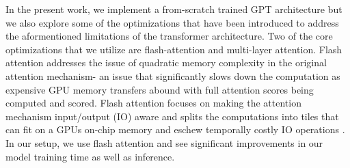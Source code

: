 In the present work, we implement a from-scratch trained GPT architecture but we also explore some of the 
optimizations that have been introduced to address the aformentioned limitations of the transformer architecture. 
Two of the core optimizations that we utilize are flash-attention and multi-layer attention. Flash attention  addresses
the issue of quadratic memory complexity in the original attention mechanism- an issue that significantly slows down 
the computation as expensive GPU memory transfers abound with full attention scores being computed and scored. 
Flash attention focuses on making the attention mechanism input/output (IO) aware and splits the computations 
into tiles that can fit on a GPUs on-chip memory and eschew temporally costly IO operations \cite{dao2022flashattentionfastmemoryefficientexact}.
 In our setup, we use flash attention and see significant improvements in our model training time as well as inference.
